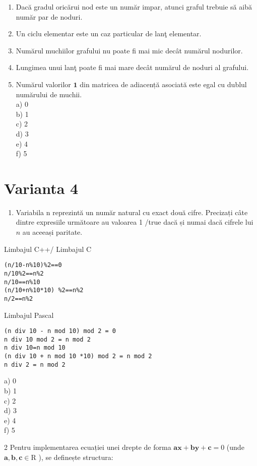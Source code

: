 \begin{enumerate}
  \item Dacă gradul oricărui nod este un număr impar, atunci graful trebuie să aibă număr par de noduri.
  \item Un ciclu elementar este un caz particular de lanţ elementar.
  \item Numărul muchiilor grafului nu poate fi mai mic decât numărul nodurilor.
  \item Lungimea unui lanţ poate fi mai mare decât numărul de noduri al grafului.
  \item Numărul valorilor $\mathbf{1}$ din matricea de adiacență asociată este egal cu dublul numărului de muchii.\\
a) 0\\
b) 1\\
c) 2\\
d) 3\\
e) 4\\
f) 5
\end{enumerate}

\section*{Varianta 4}
\begin{enumerate}
  \item Variabila n reprezintă un număr natural cu exact două cifre. Precizați câte dintre expresiile următoare au valoarea 1 /true dacă și numai dacă cifrele lui $n$ au aceeași paritate.
\end{enumerate}

Limbajul C++/ Limbajul C

\begin{verbatim}
(n/10-n%10)%2==0
n/10%2==n%2
n/10==n%10
(n/10+n%10*10) %2==n%2
n/2==n%2
\end{verbatim}

Limbajul Pascal

\begin{verbatim}
(n div 10 - n mod 10) mod 2 = 0
n div 10 mod 2 = n mod 2
n div 10=n mod 10
(n div 10 + n mod 10 *10) mod 2 = n mod 2
n div 2 = n mod 2
\end{verbatim}

a) 0\\
b) 1\\
c) 2\\
d) 3\\
e) 4\\
f) 5

2 Pentru implementarea ecuației unei drepte de forma $\mathbf{a x + b y}+\mathbf{c}=0$ (unde $\mathbf{a}, \mathbf{b}, \mathbf{c} \in \mathrm{R}$ ), se definește structura:


